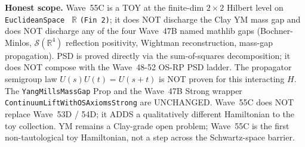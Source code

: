 \begin{remark}
\textbf{Honest scope.} Wave~55C is a TOY at the finite-dim $2 \times 2$ Hilbert level on \texttt{EuclideanSpace } $\mathbb{R}$ \texttt{(Fin 2)}; it does NOT discharge the Clay YM mass gap and does NOT discharge any of the four Wave~47B named mathlib gaps (Bochner-Minlos, $\mathcal{S}(\mathbb{R}^4)$ reflection positivity, Wightman reconstruction, mass-gap propagation). PSD is proved directly via the sum-of-squares decomposition; it does NOT compose with the Wave~48-52 OS-RP PSD ladder. The propagator semigroup law $U(s) U(t) = U(s+t)$ is NOT proven for this interacting $H$. The \texttt{YangMillsMassGap} Prop and the Wave~47B Strong wrapper \texttt{ContinuumLiftWithOSAxiomsStrong} are UNCHANGED. Wave~55C does NOT replace Wave~53D / 54D; it ADDS a qualitatively different Hamiltonian to the toy collection. YM remains a Clay-grade open problem; Wave~55C is the first non-tautological toy Hamiltonian, not a step across the Schwartz-space barrier.
\end{remark}

